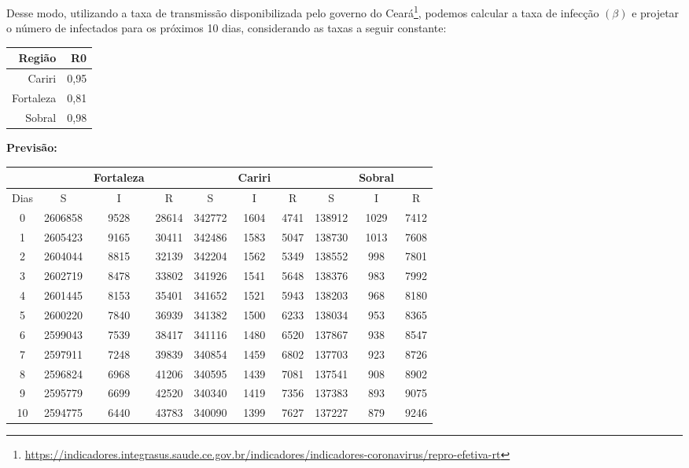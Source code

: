\documentclass[a4paper,12pt,oneside,titlepage]{article}
\begin{document}
Desse modo, utilizando a taxa de transmissão disponibilizada pelo governo do Ceará\footnote{\url{https://indicadores.integrasus.saude.ce.gov.br/indicadores/indicadores-coronavirus/repro-efetiva-rt}}, podemos calcular a taxa de infecção $(\beta)$ e projetar o número de infectados para os próximos 10 dias, considerando as taxas a seguir constante: 


\begin{table}[H]
	\centering
	\begin{tabular}{rr}
		\hline
		 Região & R0 \\ 
		\hline
		Cariri & 0,95 \\
		Fortaleza & 0,81 \\
		Sobral & 0,98 \\
		\hline
	\end{tabular}
\end{table}	

\textbf{Previsão:}


\begin{table}[H]
	\centering
	\begin{tabular}{cccccccccc}
		&  &  Fortaleza&  &  & Cariri&  &  & Sobral &\\
		\hline
		Dias&S&I& R & S & I& R & S & I & R\\
		\hline
		 0 & 2606858 & 9528 & 28614 & 342772 & 1604 & 4741 & 138912 & 1029 & 7412 \\  
		 1 & 2605423 & 9165 & 30411 & 342486 & 1583 & 5047 & 138730 & 1013 & 7608 \\ 
		 2 & 2604044 & 8815 & 32139 & 342204 & 1562 & 5349 & 138552 & 998 & 7801 \\  
		 3 & 2602719 & 8478 & 33802 & 341926 & 1541 & 5648 & 138376 & 983 & 7992 \\  
		 4 & 2601445 & 8153 & 35401 & 341652 & 1521 & 5943 & 138203 & 968 & 8180 \\  
		 5 & 2600220 & 7840 & 36939 & 341382 & 1500 & 6233 & 138034 & 953 & 8365 \\  
		 6 & 2599043 & 7539 & 38417 & 341116 & 1480 & 6520 & 137867 & 938 & 8547 \\   
		 7 & 2597911 & 7248 & 39839 & 340854 & 1459 & 6802 & 137703 & 923 & 8726 \\  
		 8 & 2596824 & 6968 & 41206 & 340595 & 1439 & 7081 & 137541 & 908 & 8902 \\   
		 9 & 2595779 & 6699 & 42520 & 340340 & 1419 & 7356 & 137383 & 893 & 9075 \\   
		 10 & 2594775 & 6440 & 43783 & 340090 & 1399 & 7627 & 137227 & 879 & 9246 \\   
		\hline
	\end{tabular}
\end{table}
	
\end{document}
